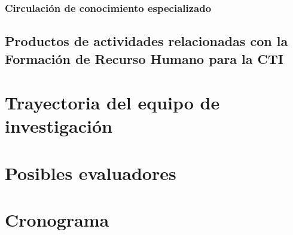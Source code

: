\documentclass[12pt]{article}
\begin{document}
\subsubsection{Circulaci\'on de conocimiento especializado}


\subsection{Productos de actividades relacionadas con la Formación de Recurso
Humano para la CTI }



\section{Trayectoria del equipo de investigaci\'on}


\section{Posibles evaluadores}

\section{Cronograma}
\end{document}
